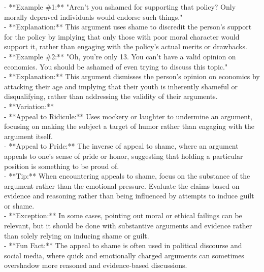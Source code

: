 \documentclass[a4paper,12pt,single,pdftex]{scrbook}
\begin{document}
{    
      - **Example \#1:** "Aren't you ashamed for supporting that policy? Only morally depraved individuals would endorse such things."
    \\

    
      - **Explanation:** This argument uses shame to discredit the person's support for the policy by implying that only those with poor moral character would support it, rather than engaging with the policy’s actual merits or drawbacks.
    \\

    
      - **Example \#2:** "Oh, you're only 13. You can't have a valid opinion on economics. You should be ashamed of even trying to discuss this topic."
    \\

    
      - **Explanation:** This argument dismisses the person's opinion on economics by attacking their age and implying that their youth is inherently shameful or disqualifying, rather than addressing the validity of their arguments.
    \\

    
      - **Variation:**
    \\

    
        - **Appeal to Ridicule:** Uses mockery or laughter to undermine an argument, focusing on making the subject a target of humor rather than engaging with the argument itself.
    \\

    
        - **Appeal to Pride:** The inverse of appeal to shame, where an argument appeals to one's sense of pride or honor, suggesting that holding a particular position is something to be proud of.
    \\

    
      - **Tip:** When encountering appeals to shame, focus on the substance of the argument rather than the emotional pressure. Evaluate the claims based on evidence and reasoning rather than being influenced by attempts to induce guilt or shame.
    \\

    
      - **Exception:** In some cases, pointing out moral or ethical failings can be relevant, but it should be done with substantive arguments and evidence rather than solely relying on inducing shame or guilt.
    \\

    
      - **Fun Fact:** The appeal to shame is often used in political discourse and social media, where quick and emotionally charged arguments can sometimes overshadow more reasoned and evidence-based discussions.
    \\

  }
\end{document}
